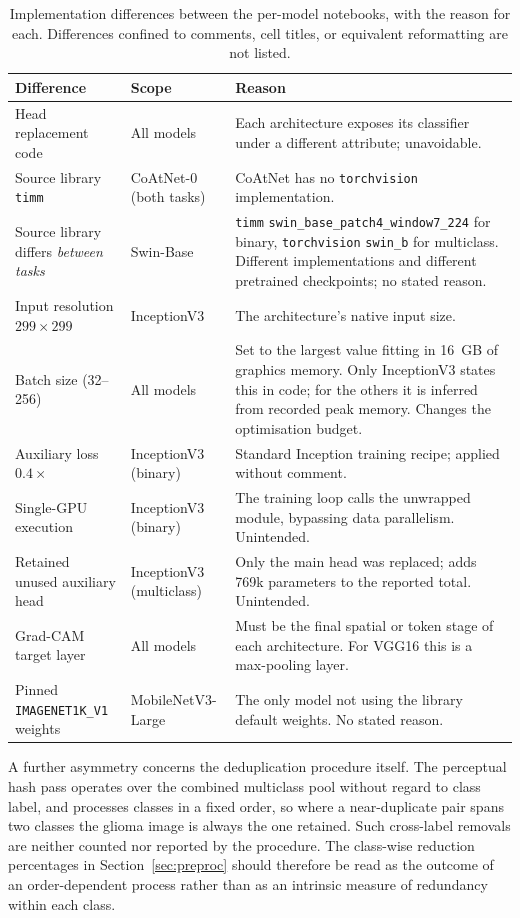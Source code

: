 \documentclass[final,3p,times,number]{elsarticle}
\begin{document}
\begin{table}[htbp]
\centering
\caption{Implementation differences between the per-model notebooks, with the reason for each. Differences confined to comments, cell titles, or equivalent reformatting are not listed.}
\label{tab:impl-diffs}
\small
\begin{tabularx}{\textwidth}{@{}llY@{}}
\toprule
Difference & Scope & Reason \\
\midrule
Head replacement code & All models & Each architecture exposes its classifier under a different attribute; unavoidable. \\
Source library \texttt{timm} & CoAtNet-0 (both tasks) & CoAtNet has no \texttt{torchvision} implementation. \\
Source library differs \emph{between tasks} & Swin-Base & \texttt{timm} \texttt{swin\_base\_patch4\_window7\_224} for binary, \texttt{torchvision} \texttt{swin\_b} for multiclass. Different implementations and different pretrained checkpoints; no stated reason. \\
Input resolution $299\times 299$ & InceptionV3 & The architecture's native input size. \\
Batch size (32--256) & All models & Set to the largest value fitting in 16~GB of graphics memory. Only InceptionV3 states this in code; for the others it is inferred from recorded peak memory. Changes the optimisation budget. \\
Auxiliary loss $0.4\times$ & InceptionV3 (binary) & Standard Inception training recipe; applied without comment. \\
Single-GPU execution & InceptionV3 (binary) & The training loop calls the unwrapped module, bypassing data parallelism. Unintended. \\
Retained unused auxiliary head & InceptionV3 (multiclass) & Only the main head was replaced; adds 769k parameters to the reported total. Unintended. \\
Grad-CAM target layer & All models & Must be the final spatial or token stage of each architecture. For VGG16 this is a max-pooling layer. \\
Pinned \texttt{IMAGENET1K\_V1} weights & MobileNetV3-Large & The only model not using the library default weights. No stated reason. \\
\bottomrule
\end{tabularx}
\end{table}

A further asymmetry concerns the deduplication procedure itself. The perceptual hash pass operates over the combined multiclass pool without regard to class label, and processes classes in a fixed order, so where a near-duplicate pair spans two classes the glioma image is always the one retained. Such cross-label removals are neither counted nor reported by the procedure. The class-wise reduction percentages in Section~\ref{sec:preproc} should therefore be read as the outcome of an order-dependent process rather than as an intrinsic measure of redundancy within each class.
\end{document}
